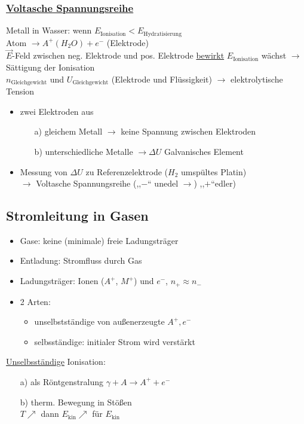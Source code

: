 \documentclass[titlepage,12pt,a4paper,ngerman]{report}
\newcommand{\tx}[1]{\textrm{#1}}
\begin{document}
\subsubsection{\underline{Voltasche Spannungsreihe}}
Metall in Wasser: wenn $ E_{\tx{Ionisation}} < E_{\tx{Hydratisierung}} $\\
Atom $ \rightarrow A^+(H_2O) + e^-$ (Elektrode)\\
$ \vec{E} $-Feld zwischen neg. Elektrode und pos. Elektrode \underline{bewirkt} $ E_{\tx{Ionisation}} $ wächst $ \rightarrow$ Sättigung der Ionisation \\
$ n_{\tx{Gleichgewicht}} $ und $ U_{\tx{Gleichgewicht}} $ (Elektrode und Flüssigkeit) $ \rightarrow $ elektrolytische Tension
\begin{itemize}
	\item zwei Elektroden aus
	\begin{itemize}
		\item[a)] gleichem Metall $ \rightarrow $ keine Spannung zwischen Elektroden
		\item[b)] unterschiedliche Metalle $ \rightarrow \Delta U $ Galvanisches Element
	\end{itemize}
	\item Messung von $ \Delta U $ zu Referenzelektrode ($ H_2 $ umspültes Platin)\\
	$ \rightarrow $ Voltasche Spannungsreihe (,,$-$`` unedel $ \rightarrow $) ,,$+$``edler)
\end{itemize}

\subsection{Stromleitung in Gasen}
\begin{itemize}
	\item Gase: keine (minimale) freie Ladungsträger
	\item Entladung: Stromfluss durch Gas
	\item Ladungsträger: Ionen ($ A^+ $, $ M^+ $) und $ e^- $, $ n_+ \approx n_- $
	\item 2 Arten: 
	\begin{itemize}
		\item unselbstständige von außenerzeugte $ A^+,e^- $
		\item selbsständige: initialer Strom wird verstärkt
	\end{itemize}
\end{itemize}
\underline{Unselbsständige}
Ionisation: \begin{itemize}
	\item[a)] als Röntgenstralung $ \gamma + A \rightarrow A^+ + e^- $
	\item[b)] therm. Bewegung in Stößen\\
	$ T \nearrow $ dann $ E_{\tx{kin}} \nearrow $ für $ E_{\tx{kin}}   $
\end{itemize}
\end{document}
